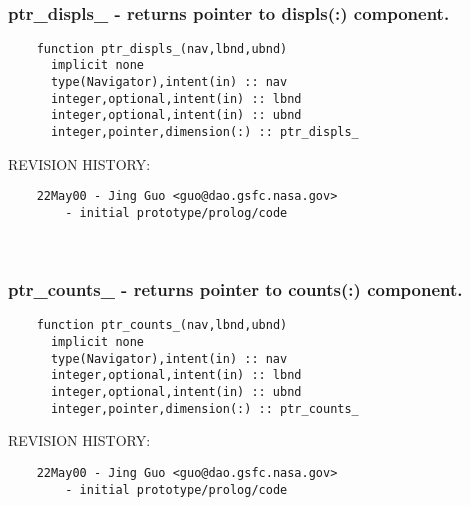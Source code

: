 \mbox{}\hrulefill\ 
 

 \subsubsection{ptr\_displs\_ - returns pointer to displs(:) component.}


 
 
\begin{verbatim} 
    function ptr_displs_(nav,lbnd,ubnd)
      implicit none
      type(Navigator),intent(in) :: nav
      integer,optional,intent(in) :: lbnd
      integer,optional,intent(in) :: ubnd
      integer,pointer,dimension(:) :: ptr_displs_
 \end{verbatim}{\sf REVISION HISTORY:}
\begin{verbatim}  	22May00	- Jing Guo <guo@dao.gsfc.nasa.gov>
 		- initial prototype/prolog/code\end{verbatim}
 
 
\mbox{}\hrulefill\ 
 

 \subsubsection{ptr\_counts\_ - returns pointer to counts(:) component.}


 
 
\begin{verbatim} 
    function ptr_counts_(nav,lbnd,ubnd)
      implicit none
      type(Navigator),intent(in) :: nav
      integer,optional,intent(in) :: lbnd
      integer,optional,intent(in) :: ubnd
      integer,pointer,dimension(:) :: ptr_counts_
 \end{verbatim}{\sf REVISION HISTORY:}
\begin{verbatim}  	22May00	- Jing Guo <guo@dao.gsfc.nasa.gov>
 		- initial prototype/prolog/code\end{verbatim}

